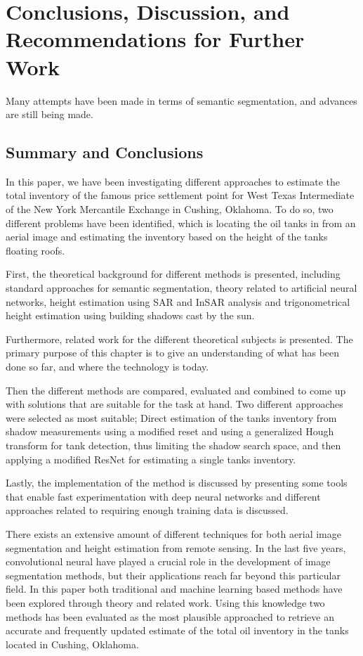 \chapter[Conclusions]{Conclusions, Discussion, and Recommendations for Further Work}

Many attempts have been made in terms of semantic segmentation, and advances are still being made. 

\section{Summary and Conclusions}
In this paper, we have been investigating different approaches to estimate the total inventory of the famous price settlement point for West Texas Intermediate of the New York Mercantile Exchange in Cushing, Oklahoma. To do so, two different problems have been identified, which is locating the oil tanks in from an aerial image and estimating the inventory based on the height of the tanks floating roofs.

First, the theoretical background for different methods is presented, including standard approaches for semantic segmentation, theory related to artificial neural networks, height estimation using SAR and InSAR analysis and trigonometrical height estimation using building shadows cast by the sun.

Furthermore, related work for the different theoretical subjects is presented. The primary purpose of this chapter is to give an understanding of what has been done so far, and where the technology is today.

Then the different methods are compared, evaluated and combined to come up with solutions that are suitable for the task at hand. Two different approaches were selected as most suitable; Direct estimation of the tanks inventory from shadow measurements using a modified reset and using a generalized Hough transform for tank detection, thus limiting the shadow search space, and then applying a modified ResNet for estimating a single tanks inventory.

Lastly, the implementation of the method is discussed by presenting some tools that enable fast experimentation with deep neural networks and different approaches related to requiring enough training data is discussed.

There exists an extensive amount of different techniques for both aerial image segmentation and height estimation from remote sensing. In the last five years, convolutional neural have played a crucial role in the development of image segmentation methods, but their applications reach far beyond this particular field. In this paper both traditional and machine learning based methods have been explored through theory and related work. Using this knowledge two methods has been evaluated as the most plausible approached to retrieve an accurate and frequently updated estimate of the total oil inventory in the tanks located in Cushing, Oklahoma.


